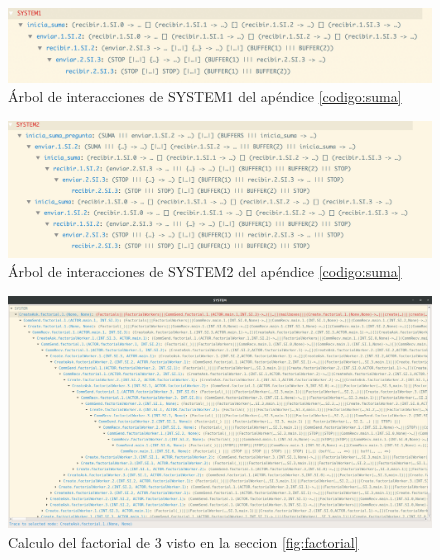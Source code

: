 \begin{figure}[H]
\begin{center}
\includegraphics[width=15 cm]{img/sumasystem1.png}
\caption{Árbol de interacciones de SYSTEM1 del apéndice \ref{codigo:suma}}
\label{modelo:suma:system1}
\end{center}
\end{figure}

\begin{figure}[H]
\begin{center}
\includegraphics[width=15 cm]{img/sumasystem2.png}
\caption{Árbol de interacciones de SYSTEM2 del apéndice \ref{codigo:suma}}
\label{modelo:suma:system2}
\end{center}
\end{figure}

\begin{figure}
\begin{center}
\includegraphics[width=24 cm, angle=90]{img/fact.png}
\caption{Calculo del factorial de 3 visto en la seccion \ref{fig:factorial}}\label{modelo:grafo}
\end{center}
\end{figure}

